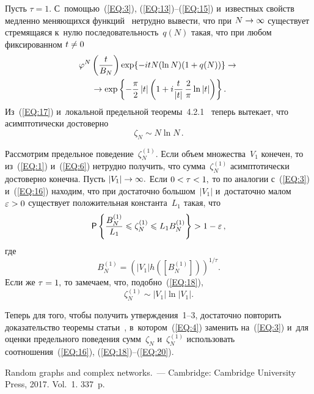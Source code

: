 \begin{multicols}{2}
Пусть $\tau =1.$ С~по\-мощью~(\ref{EQ:3}), (\ref{EQ:13})--(\ref{EQ:15}) и~известных свойств
 медленно меняющихся функций~\cite{Bin} нетрудно вывести, что при $N\hm\rightarrow \infty$ 
 существует стремящаяся к~нулю последовательность~$q(N)$ такая, что при любом фиксированном $t\hm\neq 0$
\begin{multline}
\label{EQ:17}
\varphi^N\left(\displaystyle\frac{\displaystyle t\mathstrut}{\displaystyle B_N\mathstrut}\right) \exp 
\{-itN(\ln N)(1+q(N))\}\rightarrow{}\\
{}\rightarrow \exp 
\left\{-\displaystyle\frac{\displaystyle \pi\mathstrut}{\displaystyle 2\mathstrut}\left\vert t\right\vert
\left(1+i\displaystyle\frac{\displaystyle t\mathstrut}{\displaystyle |t|\mathstrut}\,\displaystyle\frac{\displaystyle 2\mathstrut}{\displaystyle \pi\mathstrut}\ln |t|\right)\right\}.
\end{multline}
Из~(\ref{EQ:17}) и~локальной предельной теоремы~4.2.1~\cite{IL} 
теперь вытекает, что асимптотически достоверно
\begin{equation}
\label{EQ:18}
\zeta_N\sim N\ln N\,.
\end{equation}

Рассмотрим предельное поведение~$\zeta_N^{(1)}.$ Если объем множества~$V_1$ конечен, то из~(\ref{EQ:1}) 
и~(\ref{EQ:6}) нетрудно получить, что сумма~$\zeta_N^{(1)}$ асимптотически достоверно конечна.
 Пусть $|V_1|\hm\rightarrow \infty.$ Если $0\hm<\tau \hm<1,$ то по аналогии с~(\ref{EQ:3}) 
 и~(\ref{EQ:16}) находим, что при достаточно большом~$|V_1|$ и~достаточно малом $\varepsilon \hm>0$ 
 существует положительная константа~$L_1$ такая, что
\begin{equation}
\label{EQ:19}
\mathsf{P}\left\{\displaystyle\frac{\displaystyle B_N^{(1)}\mathstrut}{\displaystyle L_1\mathstrut}\leqslant \zeta_N^{(1)} \leqslant L_1B_N^{(1)}\right\}>1-\varepsilon\,,
\end{equation}
где
$$
B_N^{(1)}=(|V_1|h([B_N^{(1)}]))^{1/\tau}.
$$
Если же $\tau \hm=1,$ то замечаем, что, подобно~(\ref{EQ:18}),
\begin{equation}
\label{EQ:20}
\zeta_N^{(1)}\sim \left\vert V_1\right\vert \ln \left\vert V_1\right\vert.
\end{equation}

Теперь для того, чтобы получить утверж\-де\-ния~\mbox{1--3}, достаточно повторить доказательство 
тео\-ре\-мы статьи~\cite{Pav2}, в~котором~(\ref{EQ:4}) заменить на~(\ref{EQ:3}) и~для 
оценки предельного поведения сумм~$\zeta_N$ и~$\zeta_N^{(1)}$ использовать соотношения~(\ref{EQ:16}), 
(\ref{EQ:18})--(\ref{EQ:20}).



{\small\frenchspacing
{%
\begin{thebibliography}{99}

 Random graphs and complex networks.~--- Cambridge:
Cambridge University Press, 2017.  Vol.~1. 337~p.


\end{thebibliography}}}
\end{multicols}
